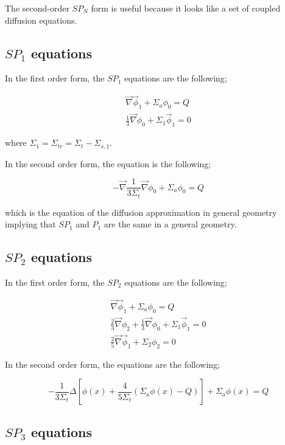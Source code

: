 \documentclass[a4paper, 12pt]{report}
\begin{document}
The second-order $SP_N$ form is useful because it looks like a set of coupled diffusion equations.

\subsection{$SP_1$ equations}

In the first order form, the $SP_1$ equations are the following;

\begin{align}
\vec{\nabla}\vec{\phi}_1 + \Sigma_a\phi_0 = Q \\
\frac{1}{3}\vec{\nabla}\phi_0 + \Sigma_1 \vec{\phi}_1 = 0
\end{align}

where $\Sigma_1 = \Sigma_{tr} = \Sigma_t - \Sigma_{s,1}$.

In the second order form, the equation is the following;

\begin{equation}
-\vec{\nabla}\frac{1}{3\Sigma_t}\vec{\nabla}\phi_0 + \Sigma_a \phi_0 = Q
\end{equation}

which is the equation of the diffusion approximation in general geometry implying that $SP_1$ and $P_1$ are the same in a general geometry.

\subsection{$SP_2$ equations}

In the first order form, the $SP_2$ equations are the following;

\begin{align}
\vec{\nabla}\vec{\phi}_1 + \Sigma_a\phi_0 = Q \\
\frac{2}{3}\vec{\nabla}\phi_2 + \frac{1}{3}\vec{\nabla}\phi_0 + \Sigma_1 \vec{\phi}_1 = 0\\
\frac{2}{5}\vec{\nabla}\vec{\phi}_1 + \Sigma_2 \phi_2 = 0
\end{align}

In the second order form, the equations are the following;

\begin{equation}\label{eqsp2}
-\frac{1}{3\Sigma_t}\Delta \left[ \phi(x) + \frac{4}{5\Sigma_t}(\Sigma_a \phi(x) - Q) \right] + \Sigma_a\phi(x) = Q
\end{equation}

\subsection{$SP_3$ equations}
\end{document}
